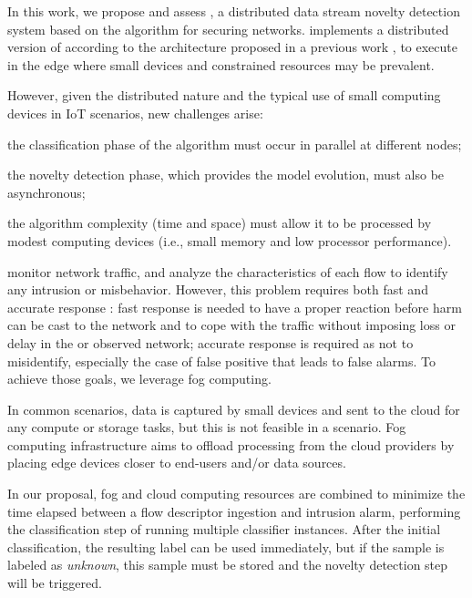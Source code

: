 In this work, we propose and assess \mfog, a distributed data stream
novelty detection system based on the algorithm \minas for securing \iot networks.
\mfog implements a distributed version of \minas according to the \arch
architecture proposed in a previous work \cite{Cassales2019a}, to execute in the
edge where small devices and constrained resources may be prevalent.

However, given the distributed nature and the typical use of small computing
devices in IoT scenarios, new challenges arise:
\begin{enumerate*}[label=(\emph{\roman*})]
  \item the classification phase of the algorithm must occur in parallel at
  different nodes;
  \item the novelty detection phase, which provides the model evolution, must
  also be asynchronous;
  \item the algorithm complexity (time and space) must allow it to be processed
  by modest computing devices (i.e., small memory and low processor performance).
\end{enumerate*}

\nids 
monitor network traffic, and analyze the characteristics of each flow 
to identify any intrusion or misbehavior.
However, this problem requires both fast and accurate response \cite{DaCosta2019a}:
fast response is needed to have a proper reaction before harm can be cast
to the network and to cope with the traffic without imposing loss or delay
in the \nids or observed network;
accurate response is required as not to misidentify,
especially the case of false positive that leads to false alarms.
To achieve those goals, we leverage fog computing.

In common \iot scenarios, data is captured by small devices and sent to the
cloud for any compute or storage tasks, but this is not feasible in a \nids
scenario.
Fog computing infrastructure aims to offload processing from the cloud
providers by placing edge devices closer to end-users and/or data sources.

In our proposal, fog and cloud computing resources are combined to minimize
the time elapsed between a flow descriptor ingestion and intrusion alarm,
performing the classification step of \minas running multiple
classifier instances.
After the initial classification, the resulting label can be used immediately,
but if the sample is labeled as \emph{unknown}, this sample must be stored and
the novelty detection step will be triggered.

